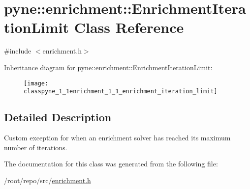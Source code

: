 \hypertarget{classpyne_1_1enrichment_1_1_enrichment_iteration_limit}{}\section{pyne\+:\+:enrichment\+:\+:Enrichment\+Iteration\+Limit Class Reference}
\label{classpyne_1_1enrichment_1_1_enrichment_iteration_limit}


{\ttfamily \#include $<$enrichment.\+h$>$}

Inheritance diagram for pyne\+:\+:enrichment\+:\+:Enrichment\+Iteration\+Limit\+:\begin{figure}[H]
\begin{center}
\leavevmode
\texttt{[image: classpyne\_1\_1enrichment\_1\_1\_enrichment\_iteration\_limit]}
\end{center}
\end{figure}


\subsection{Detailed Description}
Custom exception for when an enrichment solver has reached its maximum number of iterations. 

The documentation for this class was generated from the following file\+:\begin{DoxyCompactItemize}
\item 
/root/repo/src/\hyperlink{enrichment_8h}{enrichment.\+h}\end{DoxyCompactItemize}
